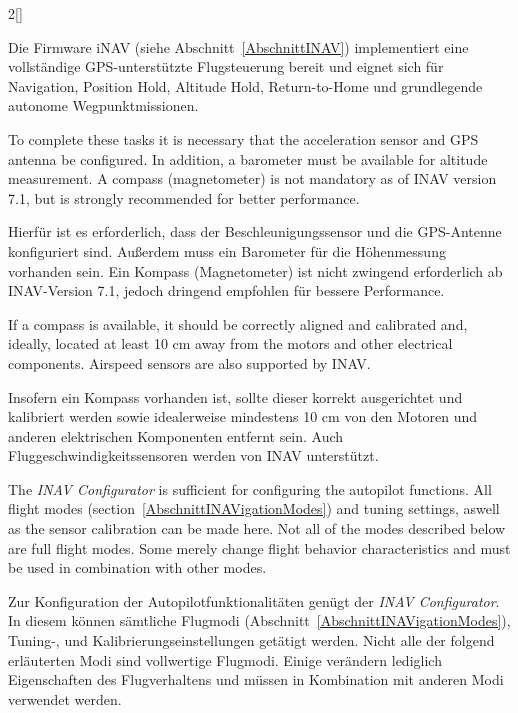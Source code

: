 \begin{paracol}{2}[]
\colger

Die Firmware iNAV (siehe Abschnitt~\ref{AbschnittINAV}) implementiert eine vollständige GPS-unterstützte Flugsteuerung bereit und eignet sich für Navigation, Position Hold, Altitude Hold, Return-to-Home und grundlegende autonome Wegpunktmissionen.

\coleng

To complete these tasks it is necessary that the acceleration sensor and GPS antenna be configured.
In addition, a barometer must be available for altitude measurement. A compass (magnetometer) is not mandatory as of INAV version 7.1, but is strongly recommended for better performance.

\colger

Hierfür ist es erforderlich, dass der Beschleunigungssensor und die GPS-Antenne konfiguriert sind.
Außerdem muss ein Barometer für die Höhenmessung vorhanden sein. Ein Kompass (Magnetometer) ist nicht zwingend erforderlich ab INAV-Version 7.1, jedoch dringend empfohlen für bessere Performance.

\coleng

If a compass is available, it should be correctly aligned and calibrated and, ideally, located at least 10 cm away from the motors and other electrical components. Airspeed sensors are also supported by INAV.

\colger

Insofern ein Kompass vorhanden ist, sollte dieser korrekt ausgerichtet und kalibriert werden sowie idealerweise mindestens 10 cm von den Motoren und anderen elektrischen Komponenten entfernt sein. Auch Fluggeschwindigkeitssensoren werden von INAV unterstützt.
 
\coleng

The \textsl{INAV Configurator} is sufficient for configuring the autopilot functions. All flight modes (section~\ref{AbschnittINAVigationModes}) and tuning settings, aswell as the sensor calibration can be made here. Not all of the modes described below are full flight modes. Some merely change flight behavior characteristics and must be used in combination with other modes. 

\colger

Zur Konfiguration der Autopilotfunktionalitäten genügt der \textsl{INAV Configurator}. In diesem können sämtliche Flugmodi (Abschnitt~\ref{AbschnittINAVigationModes}), Tuning-, und Kalibrierungseinstellungen getätigt werden. Nicht alle der folgend erläuterten Modi sind vollwertige Flugmodi. Einige verändern lediglich Eigenschaften des Flugverhaltens und müssen in Kombination mit anderen Modi verwendet werden.


\end{paracol}
